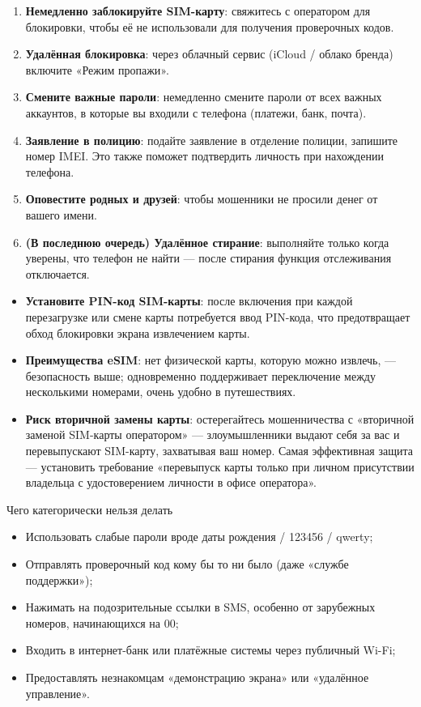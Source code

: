 \begin{enumerate}
  \item \textbf{Немедленно заблокируйте SIM-карту}: свяжитесь с оператором для блокировки, чтобы её не использовали для получения проверочных кодов.
  \item \textbf{Удалённая блокировка}: через облачный сервис (iCloud / облако бренда) включите «Режим пропажи».
  \item \textbf{Смените важные пароли}: немедленно смените пароли от всех важных аккаунтов, в которые вы входили с телефона (платежи, банк, почта).
  \item \textbf{Заявление в полицию}: подайте заявление в отделение полиции, запишите номер IMEI. Это также поможет подтвердить личность при нахождении телефона.
  \item \textbf{Оповестите родных и друзей}: чтобы мошенники не просили денег от вашего имени.
  \item \textbf{(В последнюю очередь) Удалённое стирание}: выполняйте только когда уверены, что телефон не найти — после стирания функция отслеживания отключается.
\end{enumerate}


\begin{itemize}
  \item \textbf{Установите PIN-код SIM-карты}: после включения при каждой перезагрузке или смене карты потребуется ввод PIN-кода, что предотвращает обход блокировки экрана извлечением карты.
  \item \textbf{Преимущества eSIM}: нет физической карты, которую можно извлечь, — безопасность выше; одновременно поддерживает переключение между несколькими номерами, очень удобно в путешествиях.
  \item \textbf{Риск вторичной замены карты}: остерегайтесь мошенничества с «вторичной заменой SIM-карты оператором» — злоумышленники выдают себя за вас и перевыпускают SIM-карту, захватывая ваш номер. Самая эффективная защита — установить требование «перевыпуск карты только при личном присутствии владельца с удостоверением личности в офисе оператора».
\end{itemize}

\begin{tcbwarn}{Чего категорически нельзя делать}
\begin{itemize}
  \item Использовать слабые пароли вроде даты рождения / 123456 / qwerty;
  \item Отправлять проверочный код кому бы то ни было (даже «службе поддержки»);
  \item Нажимать на подозрительные ссылки в SMS, особенно от зарубежных номеров, начинающихся на 00;
  \item Входить в интернет-банк или платёжные системы через публичный Wi-Fi;
  \item Предоставлять незнакомцам «демонстрацию экрана» или «удалённое управление».
\end{itemize}

\end{tcbwarn}

